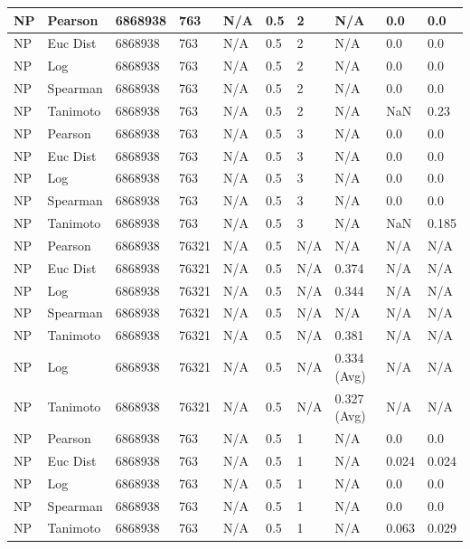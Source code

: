 \documentclass{article}
\begin{document}
\begin{longtable}{ |p{1.7cm}|p{1.9cm}|p{1.5cm}|p{1.5cm}|p{0.75cm}|p{0.75cm}|p{0.75cm}|p{0.75cm}|p{1.5cm}|p{1.5cm}|}
    NP & Pearson & 6868938 & 763 & N/A &  0.5  & 2 & N/A & 0.0 & 0.0  \\ \hline
    NP & Euc Dist & 6868938 & 763 & N/A &  0.5  &  2 & N/A &0.0 & 0.0   \\ \hline
    NP & Log & 6868938 & 763 & N/A &  0.5  &  2 & N/A & 0.0 & 0.0 \\ \hline
    NP & Spearman & 6868938 & 763 & N/A &  0.5  &  2 & N/A & 0.0 & 0.0 \\ \hline
    NP & Tanimoto & 6868938 & 763 & N/A &  0.5  &  2 & N/A & NaN & 0.23 \\ \hline
    
    NP & Pearson & 6868938 & 763 & N/A &  0.5  & 3 & N/A & 0.0 & 0.0  \\ \hline
    NP & Euc Dist & 6868938 & 763 & N/A &  0.5  & 3  & N/A &0.0 & 0.0   \\ \hline
    NP & Log & 6868938 & 763 & N/A &  0.5  & 3  & N/A & 0.0 & 0.0  \\ \hline
    NP & Spearman & 6868938 & 763 & N/A &  0.5  & 3  & N/A &0.0 & 0.0 \\ \hline
    NP & Tanimoto & 6868938 & 763 & N/A &  0.5  & 3 & N/A & NaN & 0.185 \\ \hline
    
    NP & Pearson & 6868938 & 76321 & N/A &  0.5 & N/A & N/A & N/A & N/A  \\ \hline
    NP & Euc Dist & 6868938 & 76321 & N/A &  0.5 & N/A & 0.374 & N/A & N/A   \\ \hline
    NP & Log & 6868938 & 76321 & N/A &  0.5 & N/A & 0.344 & N/A & N/A  \\ \hline
    NP & Spearman & 6868938 & 76321 & N/A &  0.5 & N/A & N/A & N/A & N/A \\ \hline
    NP & Tanimoto & 6868938 & 76321 & N/A &  0.5 & N/A & 0.381 & N/A & N/A \\ \hline
    NP & Log & 6868938 & 76321 & N/A &  0.5 & N/A & 0.334 (Avg) & N/A & N/A \\ \hline
    NP & Tanimoto & 6868938 & 76321 & N/A &  0.5 & N/A & 0.327 (Avg) & N/A & N/A \\ \hline
    
    NP & Pearson & 6868938 & 763 & N/A &  0.5  & 1 & N/A & 0.0 & 0.0  \\ \hline
    NP & Euc Dist & 6868938 & 763 & N/A &  0.5  & 1 & N/A &0.024 & 0.024   \\ \hline
    NP & Log & 6868938 & 763 & N/A &  0.5  & 1 & N/A & 0.0 & 0.0  \\ \hline
    NP & Spearman & 6868938 & 763 & N/A &  0.5  & 1 & N/A &0.0 & 0.0 \\ \hline
    NP & Tanimoto & 6868938 & 763 & N/A &  0.5  & 1 & N/A & 0.063 & 0.029 \\ \hline
    

\end{longtable}
\end{document}
